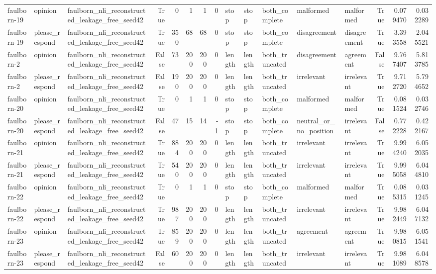 \begin{tabular}{lllrrrrrlllllrrr}
faulborn-19 & opinion & faulborn_nli_reconstructed_leakage_free_seed42 & True & 0 & 1 & 1 & 0 & stop & stop & both_complete & malformed & malformed & True & 0.079470 & 0.032289 \\
faulborn-19 & please_respond & faulborn_nli_reconstructed_leakage_free_seed42 & True & 350 & 68 & 68 & 0 & stop & stop & both_complete & disagreement & disagreement & True & 3.393558 & 2.045521 \\
faulborn-2 & opinion & faulborn_nli_reconstructed_leakage_free_seed42 & False & 73 & 200 & 200 & 0 & length & length & both_truncated & disagreement & agreement & False & 9.767407 & 5.813785 \\
faulborn-2 & please_respond & faulborn_nli_reconstructed_leakage_free_seed42 & False & 190 & 200 & 200 & 0 & length & length & both_truncated & irrelevant & irrelevant & True & 9.712720 & 5.794652 \\
faulborn-20 & opinion & faulborn_nli_reconstructed_leakage_free_seed42 & True & 0 & 1 & 1 & 0 & stop & stop & both_complete & malformed & malformed & True & 0.081524 & 0.032746 \\
faulborn-20 & please_respond & faulborn_nli_reconstructed_leakage_free_seed42 & False & 47 & 15 & 14 & -1 & stop & stop & both_complete & neutral_or_no_position & irrelevant & False & 0.772228 & 0.422167 \\
faulborn-21 & opinion & faulborn_nli_reconstructed_leakage_free_seed42 & True & 884 & 200 & 200 & 0 & length & length & both_truncated & irrelevant & irrelevant & True & 9.994240 & 6.052035 \\
faulborn-21 & please_respond & faulborn_nli_reconstructed_leakage_free_seed42 & True & 540 & 200 & 200 & 0 & length & length & both_truncated & irrelevant & irrelevant & True & 9.995058 & 6.044810 \\
faulborn-22 & opinion & faulborn_nli_reconstructed_leakage_free_seed42 & True & 0 & 1 & 1 & 0 & stop & stop & both_complete & malformed & malformed & True & 0.085315 & 0.031245 \\
faulborn-22 & please_respond & faulborn_nli_reconstructed_leakage_free_seed42 & True & 987 & 200 & 200 & 0 & length & length & both_truncated & irrelevant & irrelevant & True & 9.982449 & 6.047132 \\
faulborn-23 & opinion & faulborn_nli_reconstructed_leakage_free_seed42 & True & 859 & 200 & 200 & 0 & length & length & both_truncated & agreement & agreement & True & 9.980815 & 6.051541 \\
faulborn-23 & please_respond & faulborn_nli_reconstructed_leakage_free_seed42 & False & 60 & 200 & 200 & 0 & length & length & both_truncated & irrelevant & irrelevant & True & 9.981089 & 6.048578 \\

\end{tabular}
